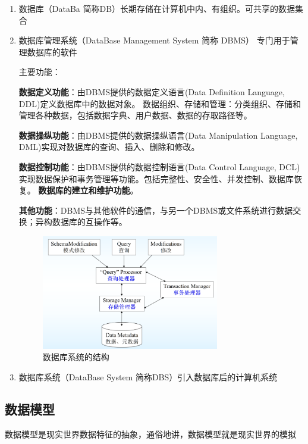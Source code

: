 \documentclass{article}
\begin{document}
\begin{enumerate}


    \item 数据库（DataBa 简称DB）长期存储在计算机中内、有组织。可共享的数据集合

    \item 数据库管理系统（DataBase Management System 简称 DBMS） 专门用于管理数据库的软件

主要功能： 

\textbf{数据定义功能}：由DBMS提供的数据定义语言(Data Definition Language, DDL)定义数据库中的数据对象。
数据组织、存储和管理：分类组织、存储和管理各种数据，包括数据字典、用户数据、数据的存取路径等。

\textbf{数据操纵功能}：由DBMS提供的数据操纵语言(Data Manipulation Language, DML)实现对数据库的查询、插入、删除和修改。

\textbf{数据控制功能}：由DBMS提供的数据控制语言(Data Control Language, DCL)实现数据保护和事务管理等功能。包括完整性、安全性、并发控制、数据库恢复。
\textbf{数据库的建立和维护功能}。

\textbf{其他功能}：DBMS与其他软件的通信，与另一个DBMS或文件系统进行数据交换；异构数据库的互操作等。


\begin{figure}[H]
    \centering
    \includegraphics[height = 5cm]{img/1-1-2.png}
    \caption{数据库系统的结构}
\end{figure}

    \item 数据库系统（DataBase System 简称DBS）引入数据库后的计算机系统

\end{enumerate}

\newpage

\subsection{数据模型}

数据模型是现实世界数据特征的抽象，通俗地讲，数据模型就是现实世界的模拟
\end{document}
